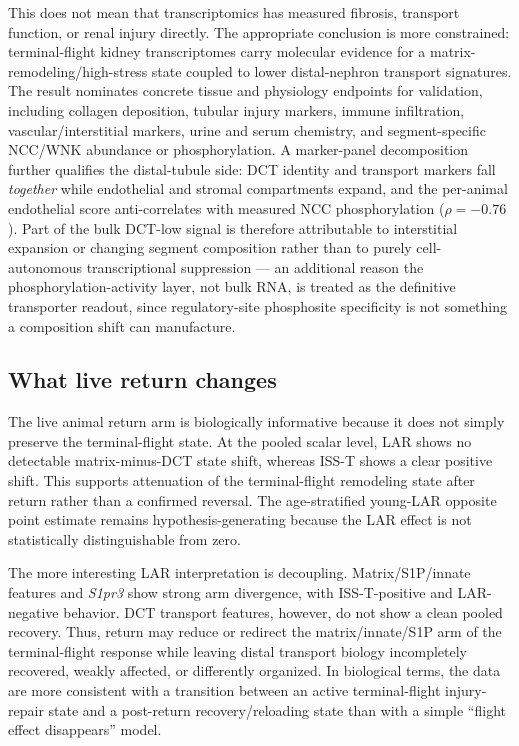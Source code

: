 \documentclass[11pt]{article}
\newcommand{\gene}[1]{\textit{#1}}
\begin{document}
This does not mean that transcriptomics has measured fibrosis, transport function, or renal injury directly. The appropriate conclusion is more constrained: terminal-flight kidney transcriptomes carry molecular evidence for a matrix-remodeling/high-stress state coupled to lower distal-nephron transport signatures. The result nominates concrete tissue and physiology endpoints for validation, including collagen deposition, tubular injury markers, immune infiltration, vascular/interstitial markers, urine and serum chemistry, and segment-specific NCC/WNK abundance or phosphorylation. A marker-panel decomposition further qualifies the distal-tubule side: DCT identity and transport markers fall \emph{together} while endothelial and stromal compartments expand, and the per-animal endothelial score anti-correlates with measured NCC phosphorylation ($\rho=-0.76$). Part of the bulk DCT-low signal is therefore attributable to interstitial expansion or changing segment composition rather than to purely cell-autonomous transcriptional suppression --- an additional reason the phosphorylation-activity layer, not bulk RNA, is treated as the definitive transporter readout, since regulatory-site phosphosite specificity is not something a composition shift can manufacture.

\subsection{What live return changes}

The live animal return arm is biologically informative because it does not simply preserve the terminal-flight state. At the pooled scalar level, LAR shows no detectable matrix-minus-DCT state shift, whereas ISS-T shows a clear positive shift. This supports attenuation of the terminal-flight remodeling state after return rather than a confirmed reversal. The age-stratified young-LAR opposite point estimate remains hypothesis-generating because the LAR effect is not statistically distinguishable from zero.

The more interesting LAR interpretation is decoupling. Matrix/S1P/innate features and \gene{S1pr3} show strong arm divergence, with ISS-T-positive and LAR-negative behavior. DCT transport features, however, do not show a clean pooled recovery. Thus, return may reduce or redirect the matrix/innate/S1P arm of the terminal-flight response while leaving distal transport biology incompletely recovered, weakly affected, or differently organized. In biological terms, the data are more consistent with a transition between an active terminal-flight injury-repair state and a post-return recovery/reloading state than with a simple ``flight effect disappears'' model.
\end{document}
